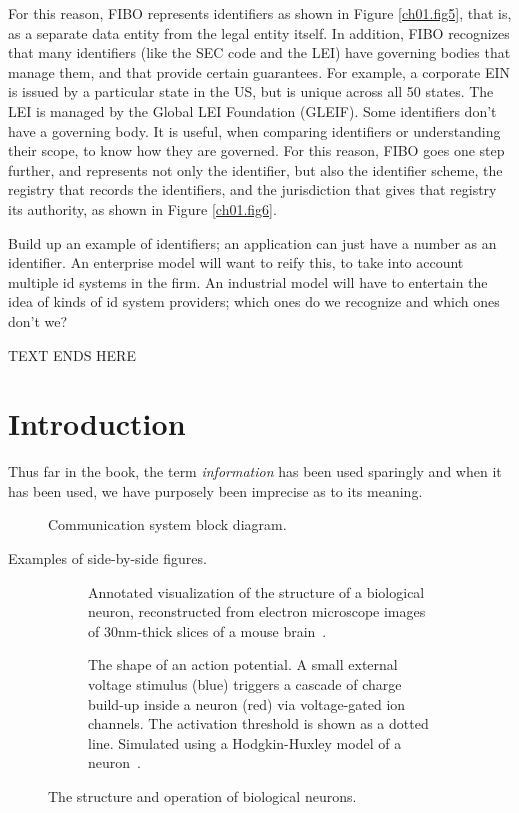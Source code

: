 For this reason, FIBO represents identifiers as shown in Figure \ref{ch01.fig5}, that is, as a separate data entity from the legal entity itself.  In addition, FIBO recognizes that many identifiers (like the SEC code and the LEI) have governing bodies that manage them, and that provide certain guarantees.  For example, a corporate EIN is issued by a particular state in the US, but is unique across all 50 states.  The LEI is managed by the Global LEI Foundation (GLEIF).  Some identifiers don't have a governing body.  It is useful, when comparing identifiers or understanding their scope, to know how they are governed.  For this reason, FIBO goes one step further, and represents not only the identifier, but also the identifier scheme, the registry that records the identifiers, and the jurisdiction that gives that registry its authority, as shown in Figure \ref{ch01.fig6}.






Build up an example of identifiers; an application can just have a number as an identifier.  An enterprise model will want to reify this, to take into account multiple id systems in the firm.  An industrial model will have to entertain the idea of kinds of id system providers; which ones do we recognize and which ones don't we? 




TEXT ENDS HERE


\section{Introduction}

Thus far in the book, the term \textit{information}
%
has been used sparingly and when
it has been used, we have purposely been imprecise as to its meaning.



\begin{figure}[hbt] %
\centering
  \figboxes
\caption{Communication system block diagram.}
\label{ch01.fig2} 
\end{figure}

Examples of side-by-side figures.

\begin{figure}[hbt]%
\centering
\begin{subfigure}[t]{0.45\textwidth}%
	\smfigboxes
\caption{Annotated visualization of the structure of a biological neuron, reconstructed from electron microscope images of 30nm-thick slices of a mouse 
brain~\cite{tesniere59}.}%
\label{fig:bioneuron}%
\end{subfigure}%
\qquad%
\begin{subfigure}[t]{0.45\textwidth}%
	\smfigboxes
\caption{The shape of an action potential. A small external voltage stimulus (blue) triggers a cascade of charge build-up inside a neuron (red) via voltage-gated ion channels. The activation threshold is shown as a dotted line. Simulated using a Hodgkin-Huxley model of a neuron~\protect\cite{weber-97}.}%
\label{fig:ap}%
\end{subfigure}%
\caption{The structure and operation of biological neurons.}%
\end{figure}

